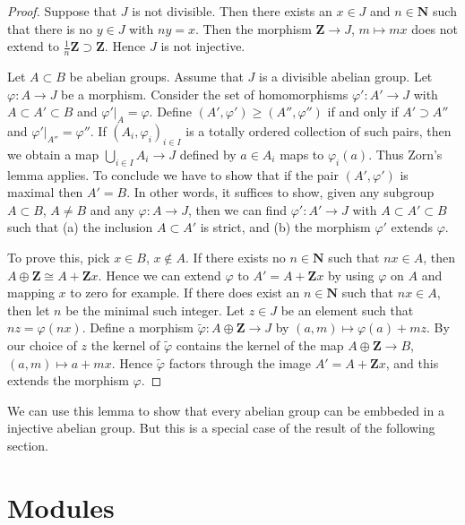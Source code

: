 \begin{proof}
Suppose that $J$ is not divisible. Then there exists
an $x \in J$ and $n \in \mathbf{N}$ such that there
is no $y \in J$ with $n y = x$. Then the morphism
$\mathbf{Z} \to J$, $m \mapsto mx$ does not extend
to $\frac{1}{n}\mathbf{Z} \supset \mathbf{Z}$. Hence
$J$ is not injective.

\medskip\noindent
Let $A \subset B$ be abelian groups.
Assume that $J$ is a divisible abelian group.
Let $\varphi : A \to J$ be a morphism.
Consider the set of homomorphisms $\varphi' : A' \to J$
with $A \subset A' \subset B$ and $\varphi'|_A = \varphi$.
Define $(A', \varphi') \geq (A'', \varphi'')$ if
and only if $A' \supset A''$ and $\varphi'|_{A''} = \varphi''$.
If $(A_i, \varphi_i)_{i \in I}$ is a totally
ordered collection of such pairs, then we obtain a map
$\bigcup_{i \in I} A_i \to J$ defined by $a \in A_i$
maps to $\varphi_i(a)$. Thus Zorn's lemma applies.
To conclude we have to show that if the pair
$(A', \varphi')$ is maximal then $A' = B$.
In other words, it suffices to show, given
any subgroup $A \subset B$, $A \not = B$ and
any $\varphi : A \to J$, then we can find
$\varphi' : A' \to J$ with $A \subset A' \subset B$
such that (a) the inclusion $A \subset A'$ is strict, and
(b) the morphism $\varphi'$ extends $\varphi$.

\medskip\noindent
To prove this, pick $x \in B$, $x \not \in A$.
If there exists no $n\in \mathbf{N}$ such that
$nx \in A$, then $A \oplus \mathbf{Z} \cong A + \mathbf{Z}x$.
Hence we can extend $\varphi$ to $A' = A + \mathbf{Z}x$
by using $\varphi$ on $A$ and mapping $x$ to zero for example.
If there does exist an $n \in \mathbf{N}$ such that
$nx \in A$, then let $n$ be the minimal such integer.
Let $z \in J$ be an element such that $nz = \varphi(nx)$.
Define a morphism $\tilde\varphi : A \oplus \mathbf{Z} \to J$ by
$(a, m) \mapsto \varphi(a) + mz$. By our choice of
$z$ the kernel of $\tilde \varphi$ contains the kernel
of the map $A \oplus \mathbf{Z} \to B$,
$(a, m) \mapsto a + mx$. Hence $\tilde \varphi$ factors
through the image $A' = A + \mathbf{Z}x$, and this extends the morphism
$\varphi$.
\end{proof}

\noindent
We can use this lemma to show that every abelian
group can be embbeded in a injective abelian
group. But this is a special case of the result of
the following section.

\section{Modules}
\label{section-injectives-modules}

